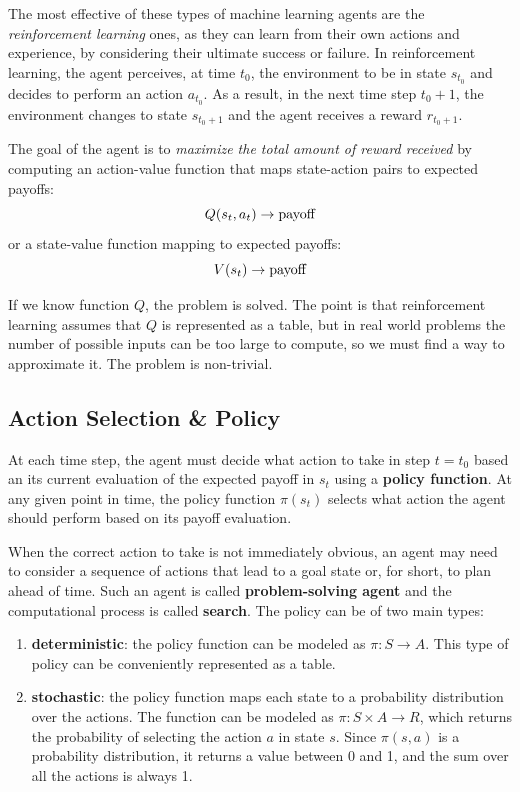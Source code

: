 \documentclass{article}
\begin{document}
The most effective of these types of machine learning agents are the \textit{reinforcement learning} ones, as they can learn from their own actions and experience, by considering their ultimate success or failure. In reinforcement learning, the agent perceives, at time $t_0$, the environment to be in state $s_{t_0}$ and decides to perform an action $a_{t_0}$. As a result, in the next time step $t_0+1$, the environment changes to state $s_{t_0+1}$ and the agent receives a reward $r_{t_0+1}$. 

The goal of the agent is to \textit{maximize the total amount of reward received} by computing an action-value function that maps state-action pairs to expected payoffs:
    $$Q(s_t, a_t) \to \textnormal{payoff}$$
or a state-value function mapping to expected payoffs:
    $$V(s_t) \to \textnormal{payoff}$$

If we know function $Q$, the problem is solved. The point is that reinforcement learning assumes that $Q$ is represented as a table, but in real world problems the number of possible inputs can be too large to compute, so we must find a way to approximate it. The problem is non-trivial.    

\subsection{Action Selection \& Policy}
At each time step, the agent must decide what action to take in step $t=t_0$ based an its current evaluation of the expected payoff in $s_t$ using a \textbf{policy function}. At any given point in time, the policy function $\pi(s_t)$ selects what action the agent should perform based on its payoff evaluation.

When the correct action to take is not immediately obvious, an agent may need to consider a sequence of actions that lead to a goal state or, for short, to plan ahead of time. Such an agent is called \textbf{problem-solving agent} and the computational process is called \textbf{search}. The policy can be of two main types:
\begin{enumerate}
    \item \textbf{deterministic}: the policy function can be modeled as $\pi: S \to A$. This type of policy can be conveniently represented as a table.
    \item \textbf{stochastic}: the policy function maps each state to a probability distribution over the actions. The function can be modeled as $\pi: S\times A\to R$, which returns the probability of selecting the action $a$ in state $s$. Since $\pi(s, a)$ is a probability distribution, it returns a value between 0 and 1, and the sum over all the actions is always 1.
\end{enumerate}
\end{document}
